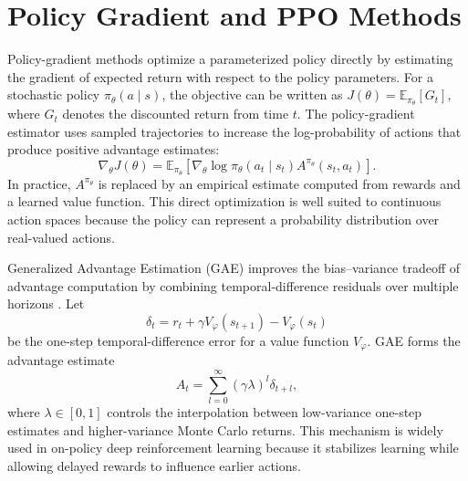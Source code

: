 \section{Policy Gradient and PPO Methods}
\label{sec:policy_gradient_and_ppo_methods}

Policy-gradient methods optimize a parameterized policy directly by estimating the gradient of expected return with respect to the policy parameters.
For a stochastic policy $\pi_\theta(a\mid s)$, the objective can be written as $J(\theta)=\mathbb{E}_{\pi_\theta}[G_t]$, where $G_t$ denotes the discounted return from time $t$.
The policy-gradient estimator uses sampled trajectories to increase the log-probability of actions that produce positive advantage estimates:
\begin{equation}
    \nabla_\theta J(\theta)
    = \mathbb{E}_{\pi_\theta}\left[\nabla_\theta \log \pi_\theta(a_t\mid s_t) A^{\pi_\theta}(s_t,a_t)\right].
\end{equation}
In practice, $A^{\pi_\theta}$ is replaced by an empirical estimate computed from rewards and a learned value function.
This direct optimization is well suited to continuous action spaces because the policy can represent a probability distribution over real-valued actions.

Generalized Advantage Estimation (GAE) improves the bias--variance tradeoff of advantage computation by combining temporal-difference residuals over multiple horizons \parencite{schulman-2015}.
Let
\begin{equation}
    \delta_t = r_t + \gamma V_\varphi(s_{t+1}) - V_\varphi(s_t)
\end{equation}
be the one-step temporal-difference error for a value function $V_\varphi$.
GAE forms the advantage estimate
\begin{equation}
    \hat{A}_t = \sum_{l=0}^{\infty}(\gamma\lambda)^l \delta_{t+l},
\end{equation}
where $\lambda\in[0,1]$ controls the interpolation between low-variance one-step estimates and higher-variance Monte Carlo returns.
This mechanism is widely used in on-policy deep reinforcement learning because it stabilizes learning while allowing delayed rewards to influence earlier actions.


